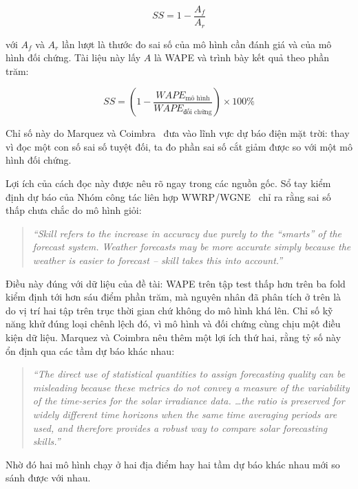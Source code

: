 \documentclass[12pt, a4paper]{report}
\begin{document}
\begin{equation}
\label{eq:ss_tong_quat}
SS = 1 - \frac{A_f}{A_r}
\end{equation}

với $A_f$ và $A_r$ lần lượt là thước đo sai số của mô hình cần đánh giá và của mô hình đối
chứng. Tài liệu này lấy $A$ là WAPE và trình bày kết quả theo phần trăm:

\begin{equation}
\label{eq:ss_wape}
SS = \left(1 - \frac{WAPE_{\text{mô hình}}}{WAPE_{\text{đối chứng}}}\right) \times 100\%
\end{equation}

Chỉ số này do Marquez và Coimbra~\cite{marquez2013skill} đưa vào lĩnh vực dự báo điện mặt trời:
thay vì đọc một con số sai số tuyệt đối, ta đo phần sai số cắt giảm được so với một mô hình đối
chứng.

Lợi ích của cách đọc này được nêu rõ ngay trong các nguồn gốc. Sổ tay kiểm định dự báo của Nhóm công
tác liên hợp WWRP/WGNE~\cite{wwrp2009verif} chỉ ra rằng sai số thấp chưa chắc do mô hình giỏi:

\begin{quote}\small
\textit{``Skill refers to the increase in accuracy due purely to the ``smarts'' of the forecast
system. Weather forecasts may be more accurate simply because the weather is easier to forecast
-- skill takes this into account.''}
\end{quote}

Điều này đúng với dữ liệu của đề tài: WAPE trên tập test thấp hơn trên ba fold kiểm định tới hơn
sáu điểm phần trăm, mà nguyên nhân đã phân tích ở trên là do vị trí hai tập trên trục thời gian
chứ không do mô hình khá lên. Chỉ số kỹ năng khử đúng loại chênh lệch đó, vì mô hình và đối
chứng cùng chịu một điều kiện dữ liệu. Marquez và Coimbra nêu thêm một lợi ích thứ hai, rằng tỷ
số này ổn định qua các tầm dự báo khác nhau:

\begin{quote}\small
\textit{``The direct use of statistical quantities to assign forecasting quality can be
misleading because these metrics do not convey a measure of the variability of the time-series
for the solar irradiance data. \dots the ratio is preserved for widely different time horizons
when the same time averaging periods are used, and therefore provides a robust way to compare
solar forecasting skills.''}
\end{quote}

Nhờ đó hai mô hình chạy ở hai địa điểm hay hai tầm dự báo khác nhau mới so sánh được với nhau.
\end{document}
